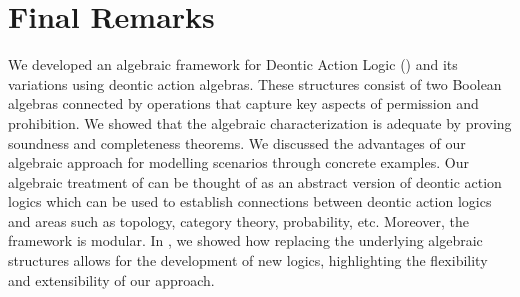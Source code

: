 \section{Final Remarks}\label{section:conclusion}

We developed an algebraic framework for Deontic Action Logic (\DAL) and its variations using deontic action algebras.
These structures consist of two Boolean algebras connected by operations that capture key aspects of permission and prohibition.
We showed that the algebraic characterization is
adequate by proving soundness and completeness theorems.
We discussed the advantages of our algebraic approach for modelling scenarios through concrete examples.
Our algebraic treatment of \DAL can be thought of as an abstract version of deontic action logics which can
be used to establish connections between deontic action logics and areas such as topology, category theory, probability, etc.
Moreover, the framework is modular.
In , we showed how replacing the underlying algebraic structures allows for the development of new logics, highlighting the flexibility and extensibility of our approach.

